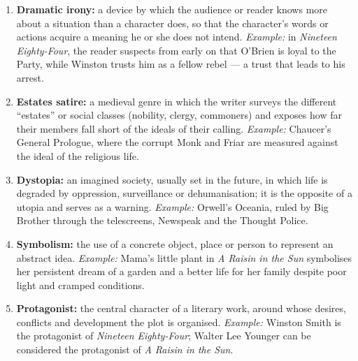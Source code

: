 \documentclass[11pt]{article}
\begin{document}
\begin{corrige}
\begin{enumerate}
\item \textbf{Dramatic irony:} a device by which the audience or reader knows more about a situation than a character does, so that the character's words or actions acquire a meaning he or she does not intend. \emph{Example:} in \emph{Nineteen Eighty-Four}, the reader suspects from early on that O'Brien is loyal to the Party, while Winston trusts him as a fellow rebel — a trust that leads to his arrest.
\item \textbf{Estates satire:} a medieval genre in which the writer surveys the different ``estates'' or social classes (nobility, clergy, commoners) and exposes how far their members fall short of the ideals of their calling. \emph{Example:} Chaucer's General Prologue, where the corrupt Monk and Friar are measured against the ideal of the religious life.
\item \textbf{Dystopia:} an imagined society, usually set in the future, in which life is degraded by oppression, surveillance or dehumanisation; it is the opposite of a utopia and serves as a warning. \emph{Example:} Orwell's Oceania, ruled by Big Brother through the telescreens, Newspeak and the Thought Police.
\item \textbf{Symbolism:} the use of a concrete object, place or person to represent an abstract idea. \emph{Example:} Mama's little plant in \emph{A Raisin in the Sun} symbolises her persistent dream of a garden and a better life for her family despite poor light and cramped conditions.
\item \textbf{Protagonist:} the central character of a literary work, around whose desires, conflicts and development the plot is organised. \emph{Example:} Winston Smith is the protagonist of \emph{Nineteen Eighty-Four}; Walter Lee Younger can be considered the protagonist of \emph{A Raisin in the Sun}.
\end{enumerate}
\end{corrige}
\end{document}
